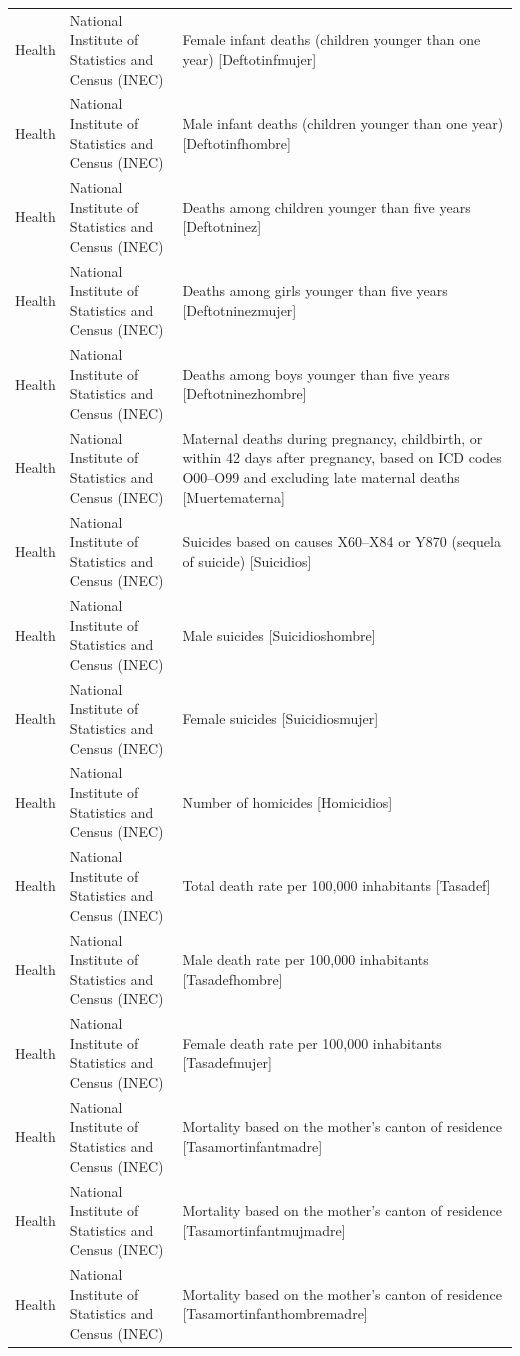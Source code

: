 \begin{landscape}
\begin{longtable}[t]{>{\raggedright\arraybackslash}p{3.4cm}>{\raggedright\arraybackslash}p{5.6cm}>{\raggedright\arraybackslash}p{12.4cm}}
Health & National Institute of Statistics and Census (INEC) & Female infant deaths (children younger than one year) [Deftotinfmujer]\\
Health & National Institute of Statistics and Census (INEC) & Male infant deaths (children younger than one year) [Deftotinfhombre]\\
Health & National Institute of Statistics and Census (INEC) & Deaths among children younger than five years [Deftotninez]\\
Health & National Institute of Statistics and Census (INEC) & Deaths among girls younger than five years [Deftotninezmujer]\\
Health & National Institute of Statistics and Census (INEC) & Deaths among boys younger than five years [Deftotninezhombre]\\
Health & National Institute of Statistics and Census (INEC) & Maternal deaths during pregnancy, childbirth, or within 42 days after pregnancy, based on ICD codes O00–O99 and excluding late maternal deaths [Muertematerna]\\
Health & National Institute of Statistics and Census (INEC) & Suicides based on causes X60–X84 or Y870 (sequela of suicide) [Suicidios]\\
Health & National Institute of Statistics and Census (INEC) & Male suicides [Suicidioshombre]\\
Health & National Institute of Statistics and Census (INEC) & Female suicides [Suicidiosmujer]\\
Health & National Institute of Statistics and Census (INEC) & Number of homicides [Homicidios]\\
Health & National Institute of Statistics and Census (INEC) & Total death rate per 100,000 inhabitants [Tasadef]\\
Health & National Institute of Statistics and Census (INEC) & Male death rate per 100,000 inhabitants [Tasadefhombre]\\
Health & National Institute of Statistics and Census (INEC) & Female death rate per 100,000 inhabitants [Tasadefmujer]\\
Health & National Institute of Statistics and Census (INEC) & Mortality based on the mother's canton of residence [Tasamortinfantmadre]\\
Health & National Institute of Statistics and Census (INEC) & Mortality based on the mother's canton of residence [Tasamortinfantmujmadre]\\
Health & National Institute of Statistics and Census (INEC) & Mortality based on the mother's canton of residence [Tasamortinfanthombrema\allowbreak{}dre]\\

\end{longtable}
\end{landscape}
